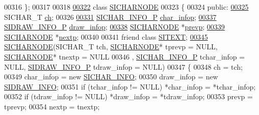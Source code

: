 \begin{DoxyCode}
00316 \};
00317 
00318 
\hyperlink{class_s_i_c_h_a_r_n_o_d_e}{00322} \textcolor{keyword}{class }\hyperlink{class_s_i_c_h_a_r_n_o_d_e}{SICHARNODE}
00323 \{
00324 \textcolor{keyword}{public}:
\hyperlink{class_s_i_c_h_a_r_n_o_d_e_a87aabfc0878d7c6cce226256873797e0}{00325}     SICHAR\_T \hyperlink{class_s_i_c_h_a_r_n_o_d_e_a87aabfc0878d7c6cce226256873797e0}{ch};  
00326 
\hyperlink{class_s_i_c_h_a_r_n_o_d_e_a03e4b28edd8566a6b605f4caeeb7bd6f}{00331}     \hyperlink{class_s_i_c_h_a_r___i_n_f_o}{SICHAR\_INFO\_P} \hyperlink{class_s_i_c_h_a_r_n_o_d_e_a03e4b28edd8566a6b605f4caeeb7bd6f}{char\_infop}; 
\hyperlink{class_s_i_c_h_a_r_n_o_d_e_aee3adfece6b51d9f71a0aa19d203b106}{00337}     \hyperlink{class_s_i_d_r_a_w___i_n_f_o}{SIDRAW\_INFO\_P} \hyperlink{class_s_i_c_h_a_r_n_o_d_e_aee3adfece6b51d9f71a0aa19d203b106}{draw\_infop};
\hyperlink{class_s_i_c_h_a_r_n_o_d_e_ad4d1b1aee15e867902bbf17938a86e64}{00338}     \hyperlink{class_s_i_c_h_a_r_n_o_d_e}{SICHARNODE} *\hyperlink{class_s_i_c_h_a_r_n_o_d_e_ad4d1b1aee15e867902bbf17938a86e64}{prevp};   
\hyperlink{class_s_i_c_h_a_r_n_o_d_e_ab188ae5c7731bcc66a1042defcf158c8}{00339}     \hyperlink{class_s_i_c_h_a_r_n_o_d_e}{SICHARNODE} *\hyperlink{class_s_i_c_h_a_r_n_o_d_e_ab188ae5c7731bcc66a1042defcf158c8}{nextp};   
00340 
00341     \textcolor{keyword}{friend} \textcolor{keyword}{class }\hyperlink{class_s_i_t_e_x_t}{SITEXT};
\hyperlink{class_s_i_c_h_a_r_n_o_d_e_a69da1200fe43cf1aab75e44650cdd21b}{00345}     \hyperlink{class_s_i_c_h_a_r_n_o_d_e_a69da1200fe43cf1aab75e44650cdd21b}{SICHARNODE}(SICHAR\_T tch, \hyperlink{class_s_i_c_h_a_r_n_o_d_e}{SICHARNODE}* tprevp = NULL, 
      \hyperlink{class_s_i_c_h_a_r_n_o_d_e}{SICHARNODE}* tnextp = NULL
00346         , \hyperlink{class_s_i_c_h_a_r___i_n_f_o}{SICHAR\_INFO\_P} tchar\_infop = NULL, \hyperlink{class_s_i_d_r_a_w___i_n_f_o}{SIDRAW\_INFO\_P} tdraw\_infop = NULL) 
00347     \{
00348         ch = tch;
00349         char\_infop = \textcolor{keyword}{new} \hyperlink{class_s_i_c_h_a_r___i_n_f_o}{SICHAR\_INFO};
00350         draw\_infop = \textcolor{keyword}{new} \hyperlink{class_s_i_d_r_a_w___i_n_f_o}{SIDRAW\_INFO};
00351         \textcolor{keywordflow}{if} (tchar\_infop != NULL) *char\_infop = *tchar\_infop;
00352         \textcolor{keywordflow}{if} (tdraw\_infop != NULL) *draw\_infop = *tdraw\_infop;
00353         prevp = tprevp;
00354         nextp = tnextp;

\end{DoxyCode}
